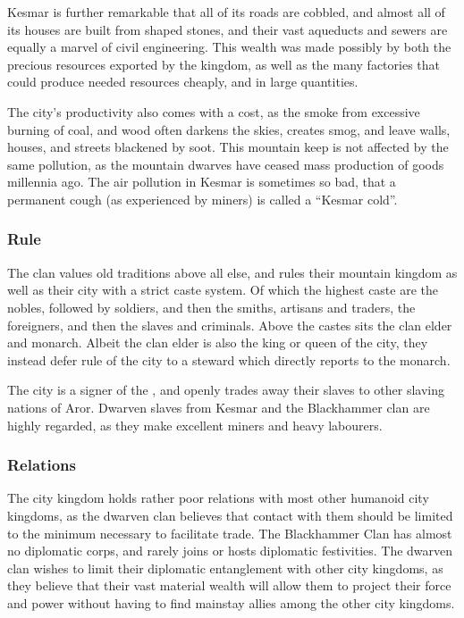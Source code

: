 Kesmar is further remarkable that all of its roads are cobbled, and almost
all of its houses are built from shaped stones, and their vast aqueducts and
sewers are equally a marvel of civil engineering. This wealth was made possibly
by both the precious resources exported by the kingdom, as well as the many
factories that could produce needed resources cheaply, and in large quantities.

The city's productivity also comes with a cost, as the smoke from excessive
burning of coal, and wood often darkens the skies, creates smog, and leave
walls, houses, and streets blackened by soot. This mountain keep is not affected
by the same pollution, as the mountain dwarves have ceased mass production of
goods millennia ago. The air pollution in Kesmar is sometimes so bad, that a
permanent cough (as experienced by miners) is called a ``Kesmar cold''.

\subsubsection{Rule}

The clan values old traditions above all else, and rules their mountain
kingdom as well as their city with a strict caste system. Of which the highest
caste are the nobles, followed by soldiers, and then the smiths, artisans and
traders, the foreigners, and then the slaves and criminals. Above the castes
sits the clan elder and monarch. Albeit the clan elder is also the king or queen
of the city, they instead defer rule of the city to a steward which directly
reports to the monarch.

The city is a signer of the , and openly trades away
their slaves to other slaving nations of Aror. Dwarven slaves from Kesmar and
the Blackhammer clan are highly regarded, as they make excellent miners and
heavy labourers.

\subsubsection{Relations}

The city kingdom holds rather poor relations with most other humanoid city
kingdoms, as the dwarven clan believes that contact with them should be limited
to the minimum necessary to facilitate trade. The Blackhammer Clan has almost no
diplomatic corps, and rarely joins or hosts diplomatic festivities. The
dwarven clan wishes to limit their diplomatic entanglement with other city
kingdoms, as they believe that their vast material wealth will allow them to
project their force and power without having to find mainstay allies among the
other city kingdoms.
